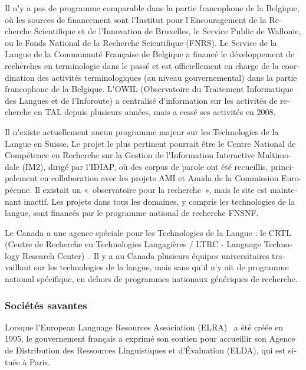 \documentclass[]{../metanetpaper}
\begin{document}
\begin{french}
\begin{multicols}{2}
Il n{\mbox '}y a pas de programme comparable dans la partie francophone de la
Belgique, où les sources de financement sont l{\mbox '}Institut pour
l{\mbox '}Encouragement de la Recherche Scientifique et de l{\mbox '}Innovation de
Bruxelles, le Service Public de Wallonie, ou le Fonds National de la
Recherche Scientifique (FNRS). Le Service de la Langue de la
Communauté Française de Belgique a financé le développement de
recherches en terminologie dans le passé et est officiellement en
charge de la coordination des activités terminologiques (au niveau
gouvernemental) dans la partie francophone de la Belgique. L{\mbox '}OWIL
(Observatoire du Traitement Informatique des Langues et de
l{\mbox '}Inforoute) a centralisé d{\mbox '}information sur les activités de recherche
en TAL depuis plusieurs années, mais a cessé ses activités en 2008.

Il n{\mbox '}existe actuellement aucun programme majeur sur les Technologies
de la Langue en Suisse. Le projet le plus pertinent pourrait être le
Centre National de Compétence en Recherche sur la Gestion de
l{\mbox '}Information Interactive Multimodale (IM2), dirigé par l{\mbox '}IDIAP, où
des corpus de parole ont été recueillis, principalement en
collaboration avec les projets AMI et Amida de la Commission Européenne. Il existait un
«~observatoire pour la recherche~», mais le site est maintenant
inactif. Les projets dans tous les domaines, y compris les
technologies de la langue, sont financés par le programme national de
recherche FNSNF.

Le Canada a une agence spéciale pour les Technologies de la Langue :
le CRTL (Centre de Recherche en Technologies Langagières / LTRC -
Language Technology Research Center)~\cite{canadacrtl}. Il y a au
Canada plusieurs équipes universitaires travaillant sur les
technologies de la langue, mais sans qu{\mbox '}il n{\mbox '}y ait de
programme national spécifique, en dehors de programmes nationaux
génériques de recherche.

\subsubsection{Sociétés savantes}

Lorsque l{\mbox '}European Language Resources Association (ELRA)~\cite{elra} a été créée
en 1995, le gouvernement français a exprimé son soutien pour
accueillir son Agence de Distribution des Ressources Linguistiques et
d{\mbox '}Évaluation (ELDA), qui est située à Paris.


\end{multicols}
\end{french}
\end{document}
